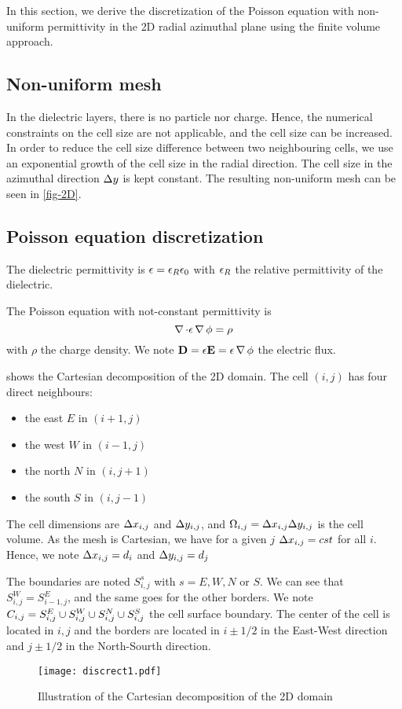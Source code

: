   In this section, we derive the discretization of the Poisson equation with non-uniform permittivity in the \ac{2D} radial azimuthal plane using the finite volume approach.


  \subsection{Non-uniform mesh}

    In the dielectric layers, there is no particle nor charge.
    Hence, the numerical constraints on the cell size are not applicable, and the cell size can be increased.
    In order to reduce the cell size difference between two neighbouring cells, we use an exponential growth of the cell size in the radial direction.
    The cell size in the azimuthal direction $\Delta y$ is kept constant.
    The resulting non-uniform mesh can be seen in \cref{fig-2D}.


  \subsection{Poisson equation discretization}


  The dielectric permittivity is $\epsilon= \epsilon_{R} \epsilon_0$ with $\epsilon_{R}$ the relative permittivity of the dielectric.

  The Poisson equation with not-constant permittivity is
  \begin{equation} \label{eq-poissondiel}
    \operatorname{{\mathbf \nabla}} \cdot \epsilon \operatorname{{\mathbf \nabla}} \phi = \rho
  \end{equation}
  with $\rho$ the charge density.
  We note ${\mathbf D}=\epsilon {\mathbf E} = \epsilon \operatorname{{\mathbf \nabla}} \phi$ the electric flux.

   shows the Cartesian decomposition of the \ac{2D} domain.
  The cell $(i,j)$ has four direct neighbours\string:
  \begin{itemize}
    \item the east $E$ in $(i+1,j)$
    \item the west $W$ in $(i-1, j)$
    \item the north $N$ in $(i, j+1)$
    \item the south $S$ in $(i, j-1)$
  \end{itemize}
  The cell dimensions are $\Delta x_{i,j}$ and $\Delta y_{i,j}$, and $\Omega_{i,j}=\Delta x_{i,j} \Delta y_{i,j}$ is the cell volume.
  As the mesh is Cartesian, we have for a given $j$ $\Delta x_{i,j} = cst$ for all $i$. Hence, we note $\Delta x_{i,j} = d_i$ and $\Delta y_{i,j} = d_j$

  The boundaries are noted $S^s_{i,j}$ with $s=E,W,N$ or $S$.
  We can see that $S^W_{i,j}=S^E_{i-1,j}$, and the same goes for the other borders.
  We note $C_{i,j} = S^E_{i,j} \cup S^W_{i,j} \cup S^N_{i,j} \cup S^S_{i,j}$ the cell surface boundary.
  The center of the cell is located in $i,j$ and the borders are located in $i\pm 1/2$ in the East-West direction and $j\pm 1/2$ in the North-Sourth direction.
  \begin{figure}[hbt]
    \centering
    \texttt{[image: discrect1.pdf]}
    \caption{Illustration of the Cartesian decomposition of the \ac{2D} domain}
    \label{fig-decompo1}
  \end{figure}


